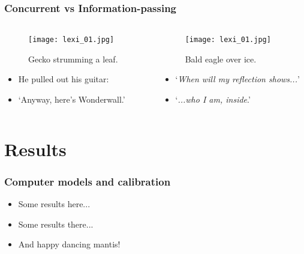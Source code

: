 \documentclass[10pt,xcolor=table]{beamer}
\begin{document}
\begin{frame}
  \frametitle{Concurrent vs Information-passing}
  \begin{columns}
    \begin{column}{0.5\textwidth}
      \begin{figure}
        \texttt{[image: lexi\_01.jpg]}
        \caption{Gecko strumming a leaf\footnotemark[2].}
      \end{figure}
      \begin{itemize}
      \item He pulled out his guitar:
      \item `Anyway, here's Wonderwall.'
      \end{itemize}
    \end{column}
    \begin{column}{0.5\textwidth}
      \begin{figure}
        \texttt{[image: lexi\_01.jpg]}
        \caption{Bald eagle over ice\footnotemark[3].}
      \end{figure}
      \begin{itemize}
      \item `\textit{When will my reflection shows...}'
      \item `\textit{...who I am, inside}.'
      \end{itemize}      
    \end{column}    
  \end{columns}
  \vspace{0.25cm}
\end{frame}


\section{Results}
\begin{frame}
  \frametitle{Computer models and calibration}
  \begin{itemize}
  \item Some results here...
  \item Some results there...
  \item And happy dancing mantis!
  \end{itemize}  
\end{frame}

\end{document}
